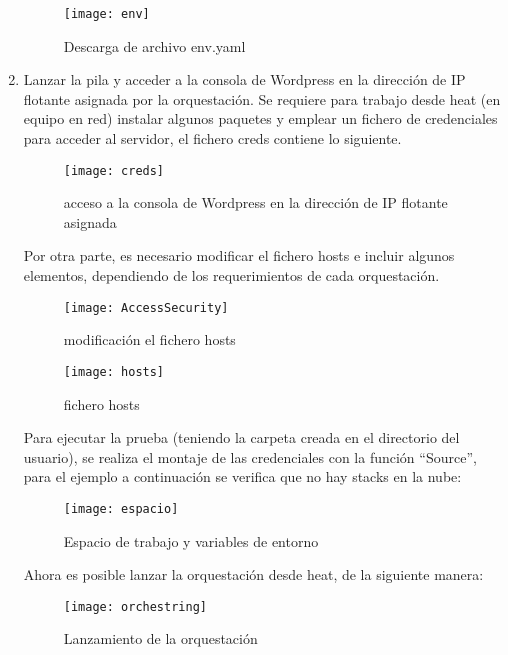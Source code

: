 \documentclass[10pt]{article}   			%
\begin{document}
\begin{enumerate}
\begin{figure}[ht]
	\centering
	\texttt{[image: env]}  
	\caption{Descarga de archivo env.yaml} 
\end{figure}


\item Lanzar la pila y acceder a la consola de Wordpress en la dirección de IP flotante asignada por la orquestación. Se requiere para trabajo desde heat (en equipo en red) instalar algunos paquetes y emplear un fichero de credenciales para acceder al servidor, el fichero creds contiene lo siguiente.



\begin{figure}[H]
	\centering
	\texttt{[image: creds]}  
	\caption{acceso a la consola de Wordpress en la dirección de IP flotante asignada} 
\end{figure}


Por otra parte, es necesario modificar el fichero hosts e incluir algunos elementos, dependiendo de los requerimientos de cada orquestación.


\begin{figure}[H]
	\centering
	\texttt{[image: AccessSecurity]}  
	\caption{modificación el fichero hosts} 
\end{figure}


\begin{figure}[H]
	\centering
	\texttt{[image: hosts]}  
	\caption{fichero hosts} 
\end{figure}

Para ejecutar la prueba (teniendo la carpeta creada en el directorio del usuario), se realiza el montaje de las credenciales con la función “Source”, para el ejemplo a continuación se verifica que no hay stacks en la nube:\\




\begin{figure}[ht]
	\centering
	\texttt{[image: espacio]}  
	\caption{Espacio de trabajo y variables de entorno} 
\end{figure}
Ahora es posible lanzar la orquestación desde heat, de la siguiente manera:




\begin{figure}[ht]
	\centering
	\texttt{[image: orchestring]}  
	\caption{Lanzamiento de la orquestación} 
\end{figure}


\end{enumerate}
\end{document}
